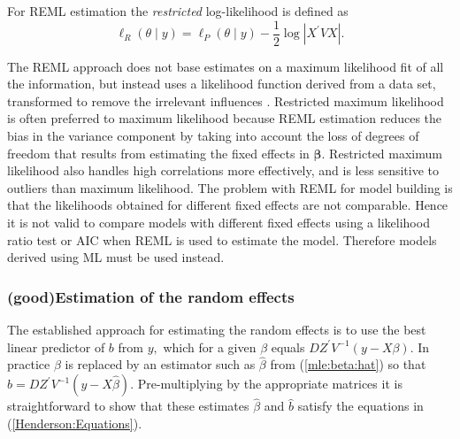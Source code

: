 \documentclass[12pt, a4paper]{report}
\theoremstyle{plain}
\theoremstyle{definition}
\theoremstyle{remark}
\begin{document}
			For REML estimation the \emph{restricted} log-likelihood is defined as
			\[
			\ell_R(\theta \mid y) =
			\ell_P(\theta \mid y) -\frac{1}{2} \log |X^\prime VX |.
			\]
			
			The REML approach does not base estimates on a maximum likelihood fit of all the information, but instead uses a likelihood function derived from a data set, transformed to remove the irrelevant influences \citep{REMLDefine}.
			Restricted maximum likelihood is often preferred to maximum likelihood because REML estimation reduces the bias in the variance component by taking into account the loss of degrees of freedom that results
			from estimating the fixed effects in $\boldsymbol{\beta}$. Restricted maximum likelihood also handles high correlations more effectively, and is less sensitive to outliers than maximum likelihood.  The problem with REML for model building is that the likelihoods obtained for different fixed effects are not comparable. Hence it is not valid to compare models with different fixed effects using a likelihood ratio test or AIC when REML is used to
			estimate the model. Therefore models derived using ML must be used instead.
			
			\subsubsection{ (good)Estimation of the random effects}
			
			The established approach for estimating the random effects is to use the best linear predictor of $b$ from $y,$ which for a given $\beta$ equals $DZ^\prime V^{-1}(y - X \beta).$ In practice $\beta$ is replaced by an estimator such as $\hat{\beta}$ from (\ref{mle:beta:hat}) so that $\hat{b} = DZ^\prime V^{-1}(y - X \hat{\beta}).$ Pre-multiplying by the appropriate matrices it is straightforward to show that these estimates $\hat{\beta}$ and $\hat{b}$ satisfy the equations in (\ref{Henderson:Equations}).
			
\end{document}
